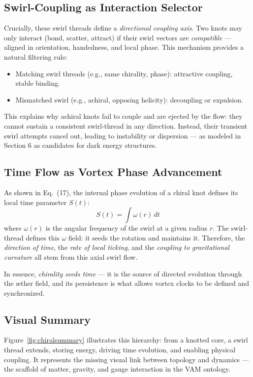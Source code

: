 \documentclass[a4paper,12pt]{article}
\begin{document}
    \subsection{Swirl-Coupling as Interaction Selector}

    Crucially, these swirl threads define a \textit{directional coupling axis}. Two knots may only interact (bond, scatter, attract) if their swirl vectors are \textit{compatible} — aligned in orientation, handedness, and local phase. This mechanism provides a natural filtering rule:
    \begin{itemize}
        \item Matching swirl threads (e.g., same chirality, phase): attractive coupling, stable binding.
        \item Mismatched swirl (e.g., achiral, opposing helicity): decoupling or expulsion.
    \end{itemize}
    This explains why achiral knots fail to couple and are ejected by the flow: they cannot sustain a consistent swirl-thread in any direction. Instead, their transient swirl attempts cancel out, leading to instability or dispersion — as modeled in Section 6 as candidates for dark energy structures.

    \subsection{Time Flow as Vortex Phase Advancement}

    As shown in Eq.~(17), the internal phase evolution of a chiral knot defines its local time parameter $S(t)$:
    \[
        S(t) = \int \omega(r) \, dt
    \]
    where $\omega(r)$ is the angular frequency of the swirl at a given radius $r$. The swirl-thread defines this $\omega$ field: it seeds the rotation and maintains it. Therefore, the \textit{direction of time}, the \textit{rate of local ticking}, and the \textit{coupling to gravitational curvature} all stem from this axial swirl flow.

    In essence, \textit{chirality seeds time} — it is the source of directed evolution through the æther field, and its persistence is what allows vortex clocks to be defined and synchronized.

    \subsection{Visual Summary}

    Figure~\ref{fig:chiralsummary} illustrates this hierarchy: from a knotted core, a swirl thread extends, storing energy, driving time evolution, and enabling physical coupling. It represents the missing visual link between topology and dynamics — the scaffold of matter, gravity, and gauge interaction in the VAM ontology.
\end{document}
